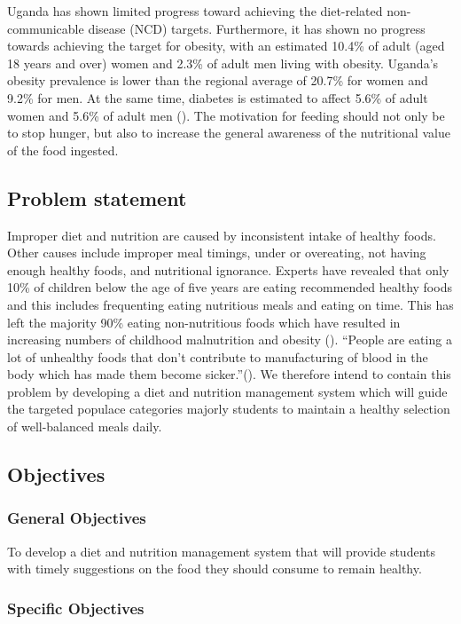 \documentclass{article}
\begin{document}
Uganda has shown limited progress toward achieving the diet-related non-communicable disease (NCD) targets. Furthermore, it has shown no progress towards achieving the target for obesity, with an estimated 10.4\% of adult (aged 18 years and over) women and 2.3\% of adult men living with obesity. Uganda's obesity prevalence is lower than the regional average of 20.7\% for women and 9.2\% for men. At the same time, diabetes is estimated to affect 5.6\% of adult women and 5.6\% of adult men (\cite{globalnutritionreportn.d.}). The motivation for feeding should not only be to stop hunger, but also to increase the general awareness of the nutritional value of the food ingested.

\subsection{Problem statement}
Improper diet and nutrition are caused by inconsistent intake of healthy foods. Other causes include improper meal timings, under or overeating, not having enough healthy foods, and nutritional ignorance. Experts have revealed that only 10\% of children below the age of five years are eating recommended healthy foods and this includes frequenting eating nutritious meals and eating on time. This has left the majority 90\% eating non-nutritious foods which have resulted in increasing numbers of childhood malnutrition and obesity (\cite{tumwine2022only}). “People are eating a lot of unhealthy foods that don’t contribute to manufacturing of blood in the body which has made them become sicker.”(\cite{tumwine2022only}). We therefore intend to contain this problem by developing a diet and nutrition management system which will guide the targeted populace categories majorly students to maintain a healthy selection of well-balanced meals daily.

\subsection{Objectives}
\subsubsection{General Objectives}

To develop a diet and nutrition management system that will provide students with timely suggestions on the food they should consume to remain healthy. 

\subsubsection{Specific Objectives}
\end{document}
